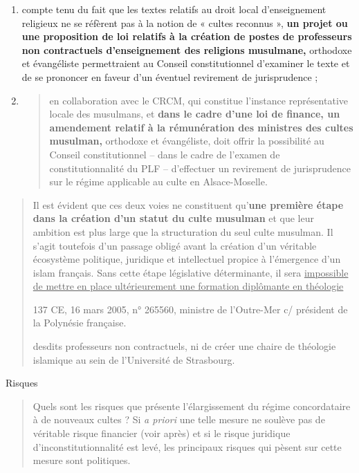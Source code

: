 \begin{enumerate}
\def\labelenumi{\alph{enumi}.}
\item
  compte tenu du fait que les textes relatifs au droit local
  d'enseignement religieux ne se réfèrent pas à la notion de « cultes
  reconnus », \textbf{un projet ou une proposition de loi relatifs à la
  création de postes de professeurs non contractuels d'enseignement des
  religions musulmane,} orthodoxe et évangéliste permettraient au
  Conseil constitutionnel d'examiner le texte et de se prononcer en
  faveur d'un éventuel revirement de jurisprudence ;
\item
  \begin{quote}
  en collaboration avec le CRCM, qui constitue l'instance représentative
  locale des musulmans, et \textbf{dans le cadre d'une loi de finance,
  un amendement relatif à la rémunération des ministres des cultes
  musulman,} orthodoxe et évangéliste, doit offrir la possibilité au
  Conseil constitutionnel -- dans le cadre de l'examen de
  constitutionnalité du PLF -- d'effectuer un revirement de
  jurisprudence sur le régime applicable au culte en Alsace-Moselle.
  \end{quote}
\end{enumerate}

\begin{quote}
Il est évident que ces deux voies ne constituent qu'\textbf{une première
étape dans la création d'un statut du culte musulman} et que leur
ambition est plus large que la structuration du seul culte musulman. Il
s'agit toutefois d'un passage obligé avant la création d'un véritable
écosystème politique, juridique et intellectuel propice à l'émergence
d'un islam français. Sans cette étape législative déterminante, il sera
\underline{impossible de mettre en place ultérieurement une formation
diplômante en théologie}

137 CE, 16 mars 2005, n° 265560, ministre de l'Outre-Mer c/ président de
la Polynésie française.



desdits professeurs non contractuels, ni de créer une chaire de
théologie islamique au sein de l'Université de Strasbourg.
\end{quote}

Risques

\begin{quote}
Quels sont les risques que présente l'élargissement du régime
concordataire à de nouveaux cultes ? Si \emph{a priori} une telle mesure
ne soulève pas de véritable risque financier (voir après) et si le
risque juridique d'inconstitutionnalité est levé, les principaux risques
qui pèsent sur cette mesure sont politiques.
\end{quote}

